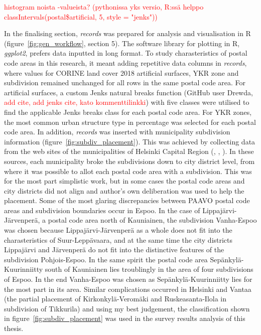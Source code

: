 \textcolor{red}{histogram noista -valueista? (pythonissa yks versio, R:ssä helppo classIntervals(postal\$artificial, 5, style = "jenks"))}

In the finalising section, \textit{records} was prepared for analysis and visualisation in R (figure~\ref{fig:gen_workflow}, section 5). The software library for plotting in R, \textit{ggplot2}, prefers data inputted in long format. To study charasteristics of postal code areas in this research, it meant adding repetitive data columns in \textit{records}, where values for CORINE land cover 2018 artificial surfaces, YKR zone and subdivision remained unchanged for all rows in the same postal code area. For artificial surfaces, a custom Jenks natural breaks function (GitHub user Drewda, \textcolor{red}{add cite, add jenks cite, kato kommenttilinkki}) with five classes were utilised to find the applicable Jenks breaks class for each postal code area. For YKR zones, the most common urban structure type in percentage was selected for each postal code area. In addition, \textit{records} was inserted with municipality subdivision information (figure~\ref{fig:subdiv_placement}). This was achieved by collecting data from the web sites of the municipalities of Helsinki Capital Region (\cite{Espoonkaupunki2020}, \cite{Helsinginkaupunkiymparistontoimiala2019}, \cite{Vantaankaupunki2019}). In these sources, each municipality broke the subdivisions down to city district level, from where it was possible to allot each postal code area with a subdivision. This was for the most part simplistic work, but in some cases the postal code areas and city districts did not align and author's own deliberation was used to help the placement. Some of the most glaring discrepancies between PAAVO postal code areas and subdivision boundaries occur in Espoo. In the case of Lippajärvi-Järvenperä, a postal code area north of Kauniainen, the subdivision Vanha-Espoo was chosen because Lippajärvi-Järvenperä as a whole does not fit into the charasteristics of Suur-Leppävaara, and at the same time the city districts Lippajärvi and Järvenperä do not fit into the distinctive features of the subdivision Pohjois-Espoo. In the same spirit the postal code area Sepänkylä-Kuurinniitty south of Kauniainen lies troublingly in the area of four subdivisions of Espoo. In the end Vanha-Espoo was chosen as Sepänkylä-Kuurinniitty lies for the most part in its area. Similar complications occurred in Helsinki and Vantaa (the partial placement of Kirkonkylä-Veromäki and Ruskeasanta-Ilola in subdivision of Tikkurila) and using my best judgement, the classification shown in figure~\ref{fig:subdiv_placement} was used in the survey results analysis of this thesis.


